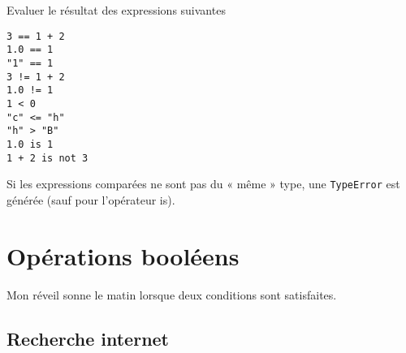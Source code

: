 \exo Evaluer le résultat des expressions suivantes
\begin{lstlisting}[numbers=none]
3 == 1 + 2
1.0 == 1 
"1" == 1
3 != 1 + 2
1.0 != 1
1 < 0
"c" <= "h"
"h" > "B"
1.0 is 1 
1 + 2 is not 3
\end{lstlisting}
\begin{important}
	Si les expressions comparées ne sont pas du « même » type, une \lstinline{TypeError} est générée (sauf pour l’opérateur is).	
\end{important}


\section{Opérations  booléens}
Mon réveil sonne le matin lorsque deux conditions sont satisfaites.

\subsection{Recherche internet}